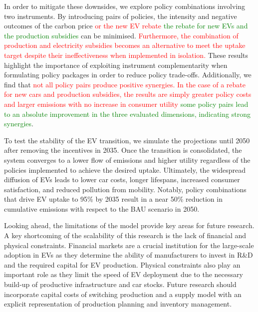 \documentclass[12pt]{article}
\begin{document}
	In order to mitigate these downsides, we explore policy combinations involving two instruments. By introducing pairs of policies, the intensity and negative outcomes of the carbon price \textcolor{red}{or the new EV rebate} \textcolor{green}{the rebate for new EVs and the production subsidies} can be minimised. \textcolor{red}{Furthermore, the combination of production and electricity subsidies becomes an alternative to meet the uptake target despite their ineffectiveness when implemented in isolation.} These results highlight the importance of exploiting instrument complementarity when formulating policy packages in order to reduce policy trade-offs. Additionally, we find that \textcolor{red}{not all policy pairs produce positive synergies. In the case of a rebate for new cars and production subsidies, the results are simply greater policy costs and larger emissions with no increase in consumer utility} \textcolor{green}{some policy pairs lead to an absolute improvement in the three evaluated dimensions, indicating strong synergies}.
	
	To test the stability of the EV transition, we simulate the projections until 2050 after removing the incentives in 2035. Once the transition is consolidated, the system converges to a lower flow of emissions and higher utility regardless of the policies implemented to achieve the desired uptake. Ultimately, the widespread diffusion of EVs leads to lower car costs, longer lifespans, increased consumer satisfaction, and reduced pollution from mobility. Notably, policy combinations that drive EV uptake to 95\% by 2035 result in a near 50\% reduction in cumulative emissions with respect to the BAU scenario in 2050.
    
    
	Looking ahead, the limitations of the model provide key areas for future research. A key shortcoming of the scalability of this research is the lack of financial and physical constraints. Financial markets are a crucial institution for the large-scale adoption in EVs as they determine the ability of manufacturers to invest in R\&D and the required capital for EV production. Physical constraints also play an important role as they limit the speed of EV deployment due to the necessary build-up of productive infrastructure and car stocks. Future research should incorporate capital costs of switching production and a supply model with an explicit representation of production planning and inventory management.
\end{document}
